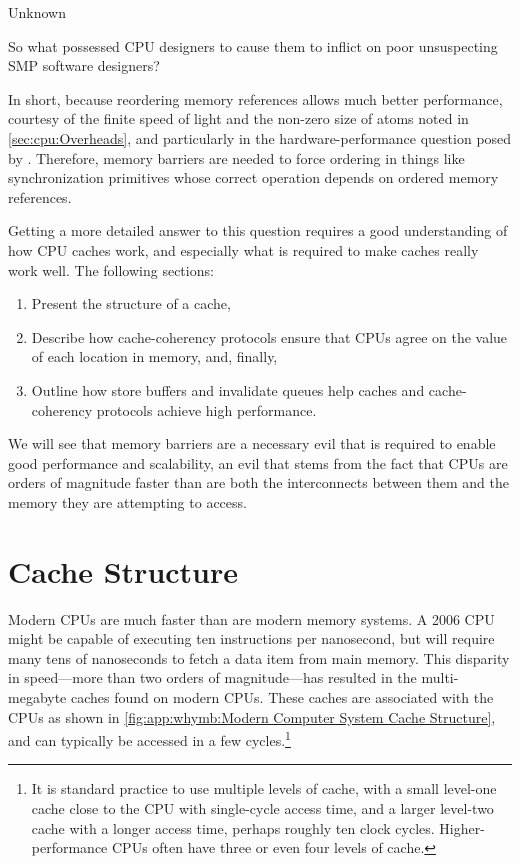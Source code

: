
%
	 {Unknown}

So what possessed CPU designers to cause them to inflict 
on poor unsuspecting SMP software designers?

In short, because reordering memory references allows much better performance,
courtesy of the finite speed of light and the non-zero size of atoms
noted in \cref{sec:cpu:Overheads}, and particularly in the
hardware-performance question posed by \QuickQuizRef{\QspeedOfLightAtoms}.
Therefore, memory barriers are needed to force ordering in things like
synchronization primitives whose correct operation depends on ordered
memory references.

Getting a more detailed answer to this question requires a good understanding
of how CPU caches work, and especially what is required to make
caches really work well.
The following sections:
\begin{enumerate}
\item	Present the structure of a cache,
\item	Describe how cache-coherency protocols ensure that CPUs agree
	on the value of each location in memory, and, finally,
\item	Outline how store buffers and invalidate queues help
	caches and cache-coherency protocols achieve high performance.
\end{enumerate}
We will see that memory barriers are a necessary evil that is required
to enable good performance and scalability, an evil that stems from
the fact that CPUs are orders of magnitude faster than are both the
interconnects between them and the memory they are attempting to access.

\section{Cache Structure}
\label{sec:app:whymb:Cache Structure}

Modern CPUs are much faster than are modern memory systems.
A 2006 CPU might be capable of executing ten instructions per nanosecond,
but will require many tens of nanoseconds to fetch a data item from
main memory.
This disparity in speed---more than two orders of magnitude---has
resulted in the multi-megabyte caches found on modern CPUs.
These caches are associated with the CPUs as shown in
\cref{fig:app:whymb:Modern Computer System Cache Structure},
and can typically be accessed in a few cycles.\footnote{
	It is standard practice to use multiple levels of cache,
	with a small level-one cache close to the CPU with
	single-cycle access time, and a larger level-two cache
	with a longer access time, perhaps roughly ten clock cycles.
	Higher-performance CPUs often have three or even four levels
	of cache.}

